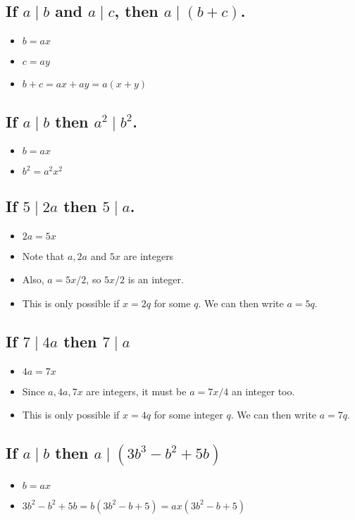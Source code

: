 \documentclass[11pt, oneside]{amsart}
\begin{document}
\subsection{If \(a \mid b\) and \(a \mid c\), then \(a \mid (b+c)\).}
\label{sec:org770c39c}
\begin{itemize}
\item \(b=ax\)
\item \(c=ay\)
\item \(b+c = ax+ay = a(x+y)\)
\end{itemize}

\subsection{If \(a \mid b\) then \(a^2 \mid b^2\).}
\label{sec:orgbfa48f0}
\begin{itemize}
\item \(b=ax\)
\item \(b^2 = a^2x^2\)
\end{itemize}

\subsection{If \(5 \mid 2a\) then \(5 \mid a\).}
\label{sec:org4f616bb}
\begin{itemize}
\item \(2a = 5x\)
\item Note that \(a, 2a\) and \(5x\) are integers
\item Also, \(a = 5x/2\), so \(5x/2\) is an integer.
\item This is only possible if \(x=2q\) for some \(q\).  We can then write \(a = 5q\).
\end{itemize}

\subsection{If \(7 \mid 4a\) then \(7 \mid a\)}
\label{sec:org34b3d69}
\begin{itemize}
\item \(4a = 7x\)
\item Since \(a, 4a, 7x\) are integers, it must be \(a = 7x/4\) an integer too.
\item This is only possible if \(x = 4q\) for some integer \(q\).  We can then write \(a=7q\).
\end{itemize}

\subsection{If \(a \mid b\) then \(a \mid (3b^3-b^2+5b)\)}
\label{sec:org2c0e1d9}
\begin{itemize}
\item \(b=ax\)
\item \(3b^2-b^2+5b = b(3b^2-b+5)=ax(3b^2-b+5)\)
\end{itemize}
\end{document}
